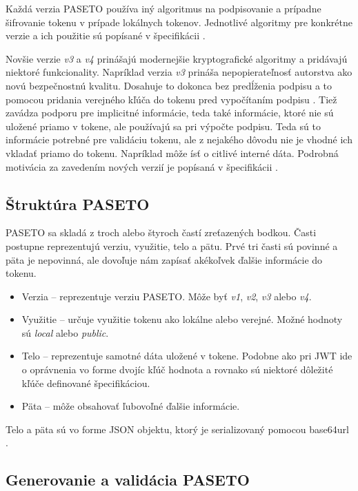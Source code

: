 Každá verzia PASETO používa iný algoritmus na podpisovanie a prípadne šifrovanie tokenu v prípade lokálnych tokenov. Jednotlivé algoritmy pre konkrétne verzie a ich použitie sú popísané v špecifikácii \cite{paseto_git}.

Novšie verzie \textit{v3} a \textit{v4} prinášajú modernejšie kryptografické algoritmy a pridávajú niektoré funkcionality. Napríklad verzia \textit{v3} prináša nepopierateľnosť autorstva ako novú bezpečnostnú kvalitu. Dosahuje to dokonca bez predĺženia podpisu a to pomocou pridania verejného kľúča do tokenu pred vypočítaním podpisu \cite{ueo}. Tiež zavádza podporu pre implicitné informácie, teda také informácie, ktoré nie sú uložené priamo v tokene, ale používajú sa pri výpočte podpisu. Teda sú to informácie potrebné pre validáciu tokenu, ale z nejakého dôvodu nie je vhodné ich vkladať priamo do tokenu. Napríklad môže ísť o citlivé interné dáta. Podrobná motivácia za zavedením nových verzií je popísaná v špecifikácii \cite{paseto_git}.

\subsection{Štruktúra PASETO}

PASETO sa skladá z troch alebo štyroch častí zreťazených bodkou. Časti postupne reprezentujú verziu, využitie, telo a pätu. Prvé tri časti sú povinné a päta je nepovinná, ale dovoľuje nám zapísať akékoľvek ďalšie informácie do tokenu.

\begin{itemize}
    \item Verzia -- reprezentuje verziu PASETO. Môže byť \textit{v1}, \textit{v2}, \textit{v3} alebo \textit{v4}.
    \item Využitie -- určuje využitie tokenu ako lokálne alebo verejné. Možné hodnoty sú \textit{local} alebo \textit{public}.
    \item Telo -- reprezentuje samotné dáta uložené v tokene. Podobne ako pri JWT ide o oprávnenia vo forme dvojíc kľúč hodnota a rovnako sú niektoré dôležité kľúče definované špecifikáciou. \cite{paseto_git}
    \item Päta -- môže obsahovať ľubovoľné ďalšie informácie.
\end{itemize}

Telo a päta sú vo forme JSON objektu, ktorý je serializovaný pomocou base64url \cite{base64_rfc}.


\subsection{Generovanie a validácia PASETO}

